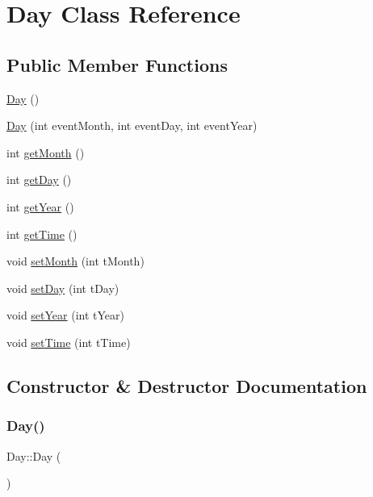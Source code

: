 \hypertarget{class_day}{}\section{Day Class Reference}
\label{class_day}
\subsection*{Public Member Functions}
\begin{DoxyCompactItemize}
\item 
\mbox{\hyperlink{class_day_a0d38b5839dd80b179cb8f0669283b3aa}{Day}} ()
\item 
\mbox{\hyperlink{class_day_a03655a953feb734f962053622195f844}{Day}} (int event\+Month, int event\+Day, int event\+Year)
\item 
int \mbox{\hyperlink{class_day_a24a3d4d6a93001fc11e93701dc4bf2ad}{get\+Month}} ()
\item 
int \mbox{\hyperlink{class_day_a60bd0b5910b263328d8ae628b5b03f33}{get\+Day}} ()
\item 
int \mbox{\hyperlink{class_day_acec9a2c25c4e19fa6f46cd2671dfa51d}{get\+Year}} ()
\item 
int \mbox{\hyperlink{class_day_a1148b6b0d02ac4018028330be5c5a5dd}{get\+Time}} ()
\item 
void \mbox{\hyperlink{class_day_a74898e6abbb0bc18e87bd6abef2be13c}{set\+Month}} (int t\+Month)
\item 
void \mbox{\hyperlink{class_day_a66f521d19fb66b83c99b659c529d152e}{set\+Day}} (int t\+Day)
\item 
void \mbox{\hyperlink{class_day_aee9321ee73becce827c858697cf69815}{set\+Year}} (int t\+Year)
\item 
void \mbox{\hyperlink{class_day_ab6b9dd83a44385bbfda6fdf30cadc0df}{set\+Time}} (int t\+Time)
\end{DoxyCompactItemize}


\subsection{Constructor \& Destructor Documentation}
\mbox{\label{class_day_a0d38b5839dd80b179cb8f0669283b3aa}} 
\subsubsection{\texorpdfstring{Day()}{Day()}\hspace{0.1cm}{\footnotesize\ttfamily [1/2]}}
{\footnotesize\ttfamily Day\+::\+Day (\begin{DoxyParamCaption}{ }\end{DoxyParamCaption})}

